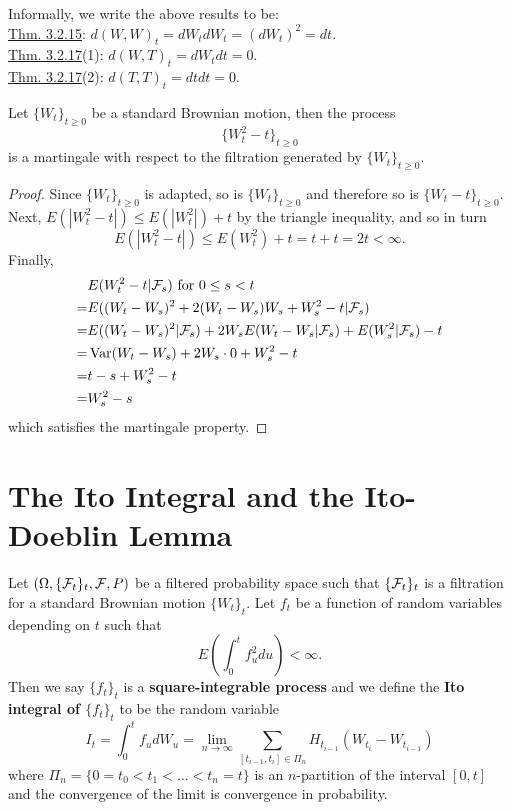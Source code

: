\documentclass[11pt,fleqn]{book} %
\begin{document}
\begin{remark} \label{rmk:3218}
Informally, we write the above results to be:\\
\hyperref[thm:3215]{Thm. 3.2.15}: \(d(W, W)_t = dW_tdW_t = (dW_t)^2 = dt\). \\
\hyperref[thm:3217]{Thm. 3.2.17}(1): \(d(W, T)_t = dW_tdt = 0\). \\
\hyperref[thm:3217]{Thm. 3.2.17}(2): \(d(T, T)_t = dtdt = 0\). \\
\end{remark}

\begin{proposition} \label{prop:3219}
Let \(\{W_t\}_{t\geq0}\) be a standard Brownian motion, then the process
\[
\{W_t^2 - t\}_{t\geq0}
\]
is a martingale with respect to the filtration generated by \(\{W_t\}_{t\geq0}\).
\end{proposition}
\begin{proof} Since \(\{W_t\}_{t\geq0}\) is adapted, so is \(\{W_t\}_{t\geq0}\) and therefore so is \(\{W_t - t\}_{t\geq0}\). \\
\indent Next, \(E(|W_t^2 - t|) \leq E(|W_t^2|) + t\) by the triangle inequality, and so in turn
\[
E(|W_t^2 - t|) \leq E(W_t^2) + t = t + t = 2t < \infty.
\]
\indent Finally,
\[
\begin{aligned}
&E(W_t^2 - t|\mathcal{F}_s) \text{ for } 0 \leq s < t \\
= &E((W_t - W_s)^2 + 2(W_t - W_s)W_s + W_s^2 - t | \mathcal{F}_s) \\
= &E((W_t - W_s)^2|\mathcal{F}_s) + 2W_sE(W_t - W_s|\mathcal{F}_s) + E(W_s^2|\mathcal{F}_s) - t \\
= &\operatorname{Var}(W_t - W_s) + 2W_s \cdot 0 + W_s^2 - t \\
= &t - s + W_s^2 - t \\
= &W_s^2 - s
\end{aligned}
\]
which satisfies the martingale property.
\end{proof}


\section{The Ito Integral and the Ito-Doeblin Lemma}

\begin{definition} \label{def:331}
Let \((\Omega, \{\mathcal{F}_t\}_t, \mathcal{F}, P)\) be a filtered probability space such that \(\{\mathcal{F}_t\}_t\) is a filtration for a standard Brownian motion \(\{W_t\}_t\). Let \(f_t\) be a function of random variables depending on \(t\) such that
\[
E\left(\int_0^t f_u^2 du\right) < \infty.
\]
\indent Then we say \(\{f_t\}_t\) is a \textbf{square-integrable process} and we define the \textbf{Ito integral of \(\{f_t\}_t\)} to be the random variable
\[
I_t = \int_0^t f_udW_u = \lim_{n\rightarrow\infty}\sum_{[t_{i-1}, t_i] \in \Pi_n} H_{t_{i-1}}(W_{t_i} - W_{t_{i-1}})
\]
where \(\Pi_n  = \{0 = t_0 < t_1 < \dots < t_n = t\}\) is an \(n\)-partition of the interval \([0, t]\) and the convergence of the limit is convergence in probability.
\end{definition}
\end{document}
